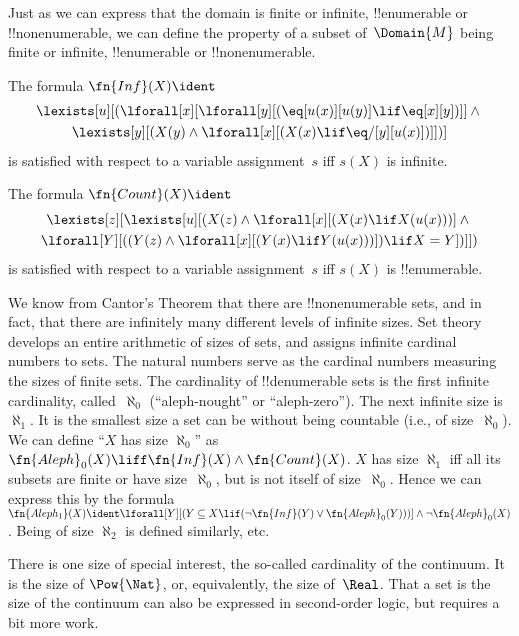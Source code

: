 \documentclass[../../../include/open-logic-section]{subfiles}
\begin{document}

\begin{explain}
Just as we can express that the domain is finite or infinite,
!!{enumerable} or !!{nonenumerable}, we can define the property of a
subset of~$\Domain{M}$ being finite or infinite, !!{enumerable} or
!!{nonenumerable}.
\end{explain}

\begin{prop}
The formula $\fn{Inf}(X) \ident$
\begin{multline*}
\lexists[u][(\lforall[x][\lforall[y][(\eq[u(x)][u(y)] \lif 
      \eq[x][y])]] \land {} \\\lexists[y][(X(y) \land \lforall[x][(X(x)
      \lif \eq/[y][u(x)])]])]
\end{multline*}
is satisfied with respect to a variable assignment~$s$ iff $s(X)$ is
infinite.
\end{prop}

\begin{prop}
The formula $\fn{Count}(X) \ident $
\begin{multline*}
\lexists[z][\lexists[u][(X(z) \land 
    \lforall[x][(X(x) \lif X(u(x)))] \land {} \\ \lforall[Y][((Y(z) \land
      \lforall[x][(Y(x) \lif Y(u(x)))]) \lif X = Y])]])
\end{multline*}
is satisfied with respect to a variable assignment~$s$ iff $s(X)$ is
!!{enumerable}.
\end{prop}

We know from Cantor's Theorem that there are !!{nonenumerable} sets,
and in fact, that there are infinitely many different levels of
infinite sizes.  Set theory develops an entire arithmetic of sizes of
sets, and assigns infinite cardinal numbers to sets.  The natural
numbers serve as the cardinal numbers measuring the sizes of finite
sets. The cardinality of !!{denumerable} sets is the first infinite
cardinality, called~$\aleph_0$ (``aleph-nought'' or
``aleph-zero''). The next infinite size is~$\aleph_1$. It is the
smallest size a set can be without being countable (i.e., of
size~$\aleph_0$).  We can define ``$X$ has size $\aleph_0$'' as
$\fn{Aleph}_0(X) \liff \fn{Inf}(X) \land \fn{Count}(X)$.  $X$ has size
$\aleph_1$ iff all its subsets are finite or have size~$\aleph_0$, but
is not itself of size~$\aleph_0$. Hence we can express this by the
formula $\fn{Aleph_1}(X) \ident \lforall[Y][(Y \subseteq X \lif
  (\lnot\fn{Inf}(Y) \lor \fn{Aleph}_0(Y)))] \land \lnot
\fn{Aleph}_0(X)$. Being of size $\aleph_2$ is defined similarly, etc.

There is one size of special interest, the so-called cardinality of
the continuum.  It is the size of $\Pow{\Nat}$, or, equivalently, the
size of~$\Real$. That a set is the size of the continuum can also be
expressed in second-order logic, but requires a bit more work.
\end{document}
